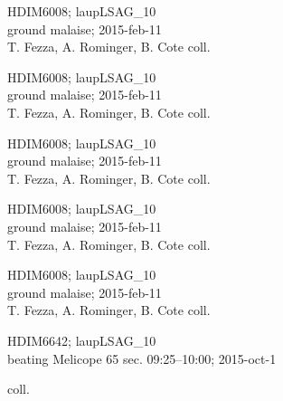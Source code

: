 \documentclass[2pt]{extarticle}
\begin{document}
\noindent
\parbox{0.16\textwidth}{\tiny \raggedright \rule[-0.3\baselineskip]{0pt}{10pt}HDIM6008; laupLSAG\_10\\ ground malaise; 2015-feb-11\\ T. Fezza, A. Rominger, B. Cote coll.}
\parbox{0.16\textwidth}{\tiny \raggedright \rule[-0.3\baselineskip]{0pt}{10pt}HDIM6008; laupLSAG\_10\\ ground malaise; 2015-feb-11\\ T. Fezza, A. Rominger, B. Cote coll.}
\parbox{0.16\textwidth}{\tiny \raggedright \rule[-0.3\baselineskip]{0pt}{10pt}HDIM6008; laupLSAG\_10\\ ground malaise; 2015-feb-11\\ T. Fezza, A. Rominger, B. Cote coll.}
\parbox{0.16\textwidth}{\tiny \raggedright \rule[-0.3\baselineskip]{0pt}{10pt}HDIM6008; laupLSAG\_10\\ ground malaise; 2015-feb-11\\ T. Fezza, A. Rominger, B. Cote coll.}
\parbox{0.16\textwidth}{\tiny \raggedright \rule[-0.3\baselineskip]{0pt}{10pt}HDIM6008; laupLSAG\_10\\ ground malaise; 2015-feb-11\\ T. Fezza, A. Rominger, B. Cote coll.}
\parbox{0.16\textwidth}{\tiny \raggedright \rule[-0.3\baselineskip]{0pt}{10pt}HDIM6642; laupLSAG\_10\\ beating Melicope 65 sec. 09:25--10:00; 2015-oct-1\\ \rule{0ex}{0ex}\hspace{6em} coll.} \\ 
\vspace{0.001in} 
\end{document}
